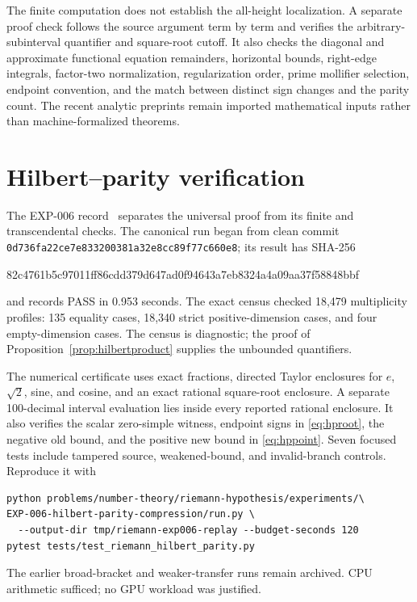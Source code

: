﻿\documentclass[11pt]{article}
\theoremstyle{remark}
\begin{document}
The finite computation does not establish the all-height localization. A
separate proof check follows the source argument term by term and verifies
the arbitrary-subinterval quantifier and square-root cutoff. It also checks
the diagonal and approximate functional equation remainders, horizontal bounds,
right-edge integrals, factor-two normalization, regularization order,
prime mollifier selection, endpoint convention, and the match between
distinct sign changes and the parity count. The recent analytic preprints
remain imported mathematical inputs rather than machine-formalized theorems.

\section{Hilbert--parity verification}

The EXP-006 record~\cite{RecordVI} separates the universal proof from its
finite and transcendental checks. The canonical run began from clean commit
\texttt{0d736fa22ce7e833200381a32e8cc89f77c660e8}; its result has SHA-256
\begin{center}\small\ttfamily
82c4761b5c97011ff86cdd379d647ad0f94643a7eb8324a4a09aa37f58848bbf
\end{center}
and records PASS in 0.953 seconds. The exact census checked 18,479
multiplicity profiles: 135 equality cases, 18,340 strict positive-dimension
cases, and four empty-dimension cases. The census is diagnostic; the proof of
Proposition~\ref{prop:hilbertproduct} supplies the unbounded quantifiers.

The numerical certificate uses exact fractions, directed Taylor enclosures
for $e$, $\sqrt2$, sine, and cosine, and an exact rational square-root
enclosure. A separate 100-decimal interval evaluation lies inside every
reported rational enclosure. It also verifies the scalar zero-simple witness,
endpoint signs in \eqref{eq:hproot}, the negative old bound, and the positive
new bound in \eqref{eq:hppoint}. Seven focused tests include tampered source,
weakened-bound, and invalid-branch controls. Reproduce it with
\begin{verbatim}
python problems/number-theory/riemann-hypothesis/experiments/\
EXP-006-hilbert-parity-compression/run.py \
  --output-dir tmp/riemann-exp006-replay --budget-seconds 120
pytest tests/test_riemann_hilbert_parity.py
\end{verbatim}
The earlier broad-bracket and weaker-transfer runs remain archived. CPU
arithmetic sufficed; no GPU workload was justified.
\end{document}
